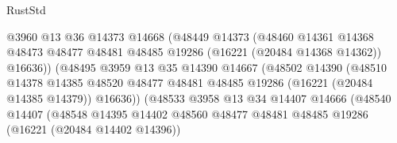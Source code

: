\begin{lexlean}{RustStd}
\begin{coremodule}
                                      @3960
                                      @13
                                      @36
                                      @14373
                                      @14668
                                      (@48449
                                        @14373
                                        (@48460
                                          @14361
                                          @14368
                                          @48473
                                          @48477
                                          @48481
                                          @48485
                                          @19286
                                          (@16221 (@20484 @14368 @14362))
                                          @16636))
                                      (@48495
                                        @3959
                                        @13
                                        @35
                                        @14390
                                        @14667
                                        (@48502
                                          @14390
                                          (@48510
                                            @14378
                                            @14385
                                            @48520
                                            @48477
                                            @48481
                                            @48485
                                            @19286
                                            (@16221 (@20484 @14385 @14379))
                                            @16636))
                                        (@48533
                                          @3958
                                          @13
                                          @34
                                          @14407
                                          @14666
                                          (@48540
                                            @14407
                                            (@48548
                                              @14395
                                              @14402
                                              @48560
                                              @48477
                                              @48481
                                              @48485
                                              @19286
                                              (@16221 (@20484 @14402 @14396))

\end{coremodule}
\end{lexlean}
